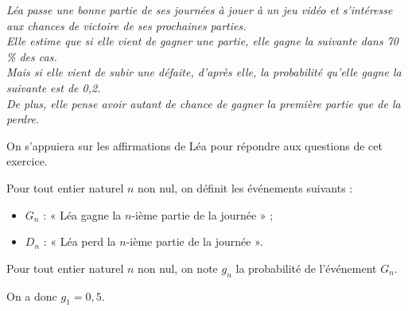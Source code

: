 \emph{%
Léa passe une bonne partie de ses journées à jouer à un jeu vidéo et s'intéresse aux chances de victoire de ses prochaines parties.\\
Elle estime que si elle vient de gagner une partie, elle gagne la suivante dans 70\,\% des cas.\\
Mais si elle vient de subir une défaite, d'après elle, la probabilité qu'elle gagne la suivante est de 0,2.\\
De plus, elle pense avoir autant de chance de gagner la première partie que de la perdre.%
}

\smallskip

On s'appuiera sur les affirmations de Léa pour répondre aux questions de cet exercice.

\smallskip

Pour tout entier naturel $n$ non nul, on définit les événements suivants :

\begin{itemize}
	\item $G_n$ : « Léa gagne la $n$-ième partie de la journée » ;
	\item $D_n$ : « Léa perd la $n$-ième partie de la journée ».
\end{itemize}

Pour tout entier naturel $n$ non nul, on note $g_n$ la probabilité de l'événement $G_n$.

On a donc $g_1 = 0,5$.

